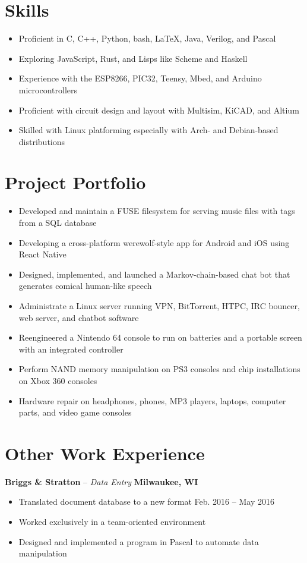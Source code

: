 \documentclass[letterpaper,10pt]{article}
\begin{document}
\section{Skills}
\begin{itemize}
\item Proficient in C, C++, Python, bash, \LaTeX, Java, Verilog, and Pascal
\item Exploring JavaScript, Rust, and Lisps like Scheme and Haskell
\item Experience with the ESP8266, PIC32, Teensy, Mbed, and Arduino microcontrollers
\item Proficient with circuit design and layout with Multisim, KiCAD, and Altium
\item Skilled with Linux platforming especially with Arch- and Debian-based distributions
\end{itemize}

\section{Project Portfolio}
\begin{itemize}
\item Developed and maintain a FUSE filesystem for serving music files with tags from a SQL database
\item Developing a cross-platform werewolf-style app for Android and iOS using React Native
\item Designed, implemented, and launched a Markov-chain-based chat bot that generates comical human-like speech
\item Administrate a Linux server running VPN, BitTorrent, HTPC, IRC bouncer, web server, and chatbot software
\item Reengineered a Nintendo 64 console to run on batteries and a portable screen with an integrated controller
\item Perform NAND memory manipulation on PS3 consoles and chip installations on Xbox 360 consoles
\item Hardware repair on headphones, phones, MP3 players, laptops, computer parts, and video game consoles
\end{itemize}

\section{Other Work Experience}
\textbf{Briggs \& Stratton} -- \textit{Data Entry} \hfill \textbf{Milwaukee, WI}
{\setlength{\parskip}{0pt}\begin{itemize}
\item Translated document database to a new format \hfill Feb. 2016 -- May 2016
\item Worked exclusively in a team-oriented environment
\item Designed and implemented a program in Pascal to automate data manipulation
\end{itemize}}
\end{document}
